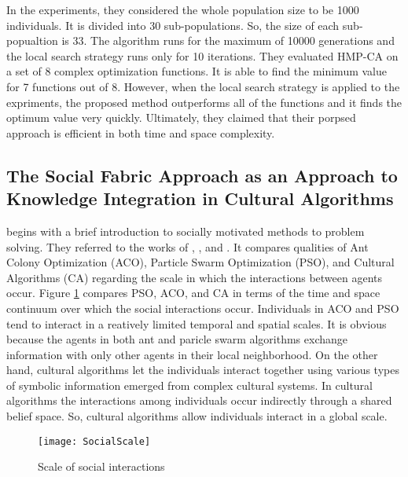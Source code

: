 In the experiments, they considered the whole population size to be 1000 individuals. It is divided into 30 sub-populations. So, the size of each sub-popualtion is 33. The algorithm runs for the maximum of 10000 generations and the local search strategy runs only for 10 iterations. They evaluated HMP-CA on a set of 8 complex optimization functions. It is able to find the minimum value for 7 functions out of 8. However, when the local search strategy is applied to the expriments, the proposed method outperforms all of the functions and it finds the optimum value very quickly. Ultimately, they claimed that their porpsed approach is efficient in both time and space complexity.

\subsection{The Social Fabric Approach as an Approach to Knowledge Integration in Cultural Algorithms}	
\citet{reynolds2008social} begins with a brief introduction to socially motivated methods to problem solving. They referred to the works of \citet{hu2003engineering}, \citet{reynolds2007exploring}, and \citet{cheng2005weaving}. It compares qualities of Ant Colony Optimization (ACO), Particle Swarm Optimization (PSO), and Cultural Algorithms (CA) regarding the scale in which the interactions between agents occur. Figure \ref{fig:SFAPP} compares PSO, ACO, and CA in terms of the time and space continuum over which the social interactions occur. Individuals in ACO and PSO tend to interact in a reatively limited temporal and spatial scales. It is obvious because the agents in both ant and paricle swarm algorithms exchange information with only other agents in their local neighborhood. On the other hand, cultural algorithms let the individuals interact together using various types of symbolic information emerged from complex cultural systems. In cultural algorithms the interactions among individuals occur indirectly through a shared belief space. So, cultural algorithms allow individuals interact in a global scale.
\begin{figure}[h]
	\texttt{[image: SocialScale]}
	\centering
	\caption{Scale of social interactions \citet{reynolds2008social}}
	\label{fig:SFAPP}
\end{figure}
